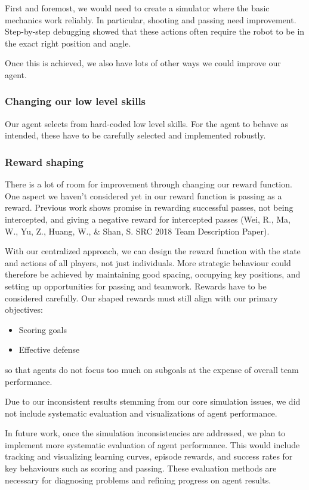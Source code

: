 First and foremost, we would need to create a simulator where the basic mechanics work reliably. In particular, shooting and passing need improvement. Step-by-step debugging showed that these actions often require the robot to be in the exact right position and angle.

Once this is achieved, we also have lots of other ways we could improve our agent.

\subsubsection{Changing our low level skills}
Our agent selects from hard-coded low level skills. For the agent to behave as intended, these have to be carefully selected and implemented robustly.

\subsubsection{Reward shaping}
There is a lot of room for improvement through changing our reward function.
One aspect we haven't considered yet in our reward function is passing as a reward.
Previous work shows promise in rewarding successful passes, not being intercepted, and giving a negative reward for intercepted passes
(Wei, R., Ma, W., Yu, Z., Huang, W., \& Shan, S. SRC 2018 Team Description Paper).

With our centralized approach, we can design the reward function with the state and actions of all players, not just individuals.
More strategic behaviour could therefore be achieved by maintaining good spacing, occupying key positions, and setting up opportunities for passing and teamwork.
Rewards have to be considered carefully. Our shaped rewards must still align with our primary objectives:
\begin{itemize}
    \item Scoring goals
    \item Effective defense
\end{itemize}
so that agents do not focus too much on subgoals at the expense of overall team performance.

Due to our inconsistent results stemming from our core simulation issues, we did not include systematic evaluation and visualizations of agent performance.

In future work, once the simulation inconsistencies are addressed, we plan to implement more systematic evaluation of agent performance. This would include tracking and visualizing learning curves, episode rewards, and success rates for key behaviours such as scoring and passing. These evaluation methods are necessary for diagnosing problems and refining progress on agent results.
